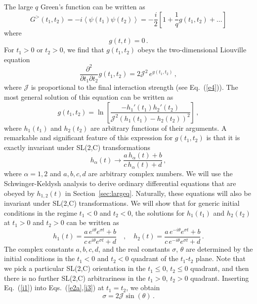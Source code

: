 \documentclass[prx,aps,onecolumn,amsfonts,showpacs,superscriptaddress,preprint,eqsecnum]
{revtex4-1}
\newcommand{\beq}{\begin{equation}}
\newcommand{\eeq}{\end{equation}}
\begin{document}
The large $q$ Green's function can be written as \cite{Maldacena2016}
\beq
G^> (t_1, t_2) = -i \left\langle \psi (t_1) \psi (t_2) \right\rangle = - \frac{i}{2} \left[ 
1 + \frac{1}{q} g(t_1, t_2) + \ldots \right] \label{e2}
\eeq
where 
\beq
g(t, t) = 0 \,. \label{e2a}
\eeq
For $t_1 >0$ or $t_2 > 0$, we find that $g(t_1, t_2)$ obeys the two-dimensional Liouville equation
\beq
\frac{\partial^2}{\partial t_1 \partial t_2} g(t_1, t_2) = 2 \mathcal{J}^2 \, e^{g (t_1, t_2)} \,,
\label{liouville}
\eeq
where $\mathcal{J}$ is proportional to the final interaction strength (see Eq.~(\ref{e4})).
The most general solution of this equation can be written as \cite{CROWDY}
\beq
g(t_1, t_2)  = \ln \left[ \frac{-h_1' (t_1) h_2' (t_2)}{\mathcal{J}^2 (h_{1} (t_1) - h_{2} (t_2))^2} \right] \, , \label{i3}
\eeq
where $h_1 (t_1)$ and $h_2 (t_2)$ are arbitrary functions of their arguments. A remarkable and significant
feature of this expression for $g(t_1, t_2)$ is that it is exactly invariant under SL(2,C) transformations
\beq
h_{\alpha} (t) \rightarrow \frac{a \, h_\alpha (t) + b}{c \, h_{\alpha} (t) + d} \label{sl2c} \, ,
\eeq
where $\alpha=1,2$ and $a,b,c,d$ are arbitrary complex numbers.
We will use the Schwinger-Keldysh analysis to derive ordinary differential equations
that are obeyed by $h_{1,2} (t)$ in Section~\ref{sec:largeq}. Naturally, 
these equations will also be invariant under SL(2,C) transformations. 
We will show that for generic initial conditions in the regime $t_{1}<0$ and $t_2 <0$, the solutions
for $h_1 (t_1)$ and $h_2 (t_2)$ at $t_1 > 0$ and $t_2 > 0$ can be written as
\beq
h_1 (t) = \frac{a \, e^{i \theta} e^{\sigma t} + b}{c\, e^{i \theta} e^{\sigma t} + d} 
\quad, \quad h_2 (t) = \frac{a \, e^{-i \theta} e^{\sigma t} + b}{c \, e^{-i \theta} e^{\sigma t} + d} \, . \label{i1}
\eeq
The complex constants $a,b,c,d$, and the real constants $\sigma$, $\theta$ are determined by the
initial conditions in the $t_1 < 0$ and $t_2 < 0$ quadrant of the $t_1$-$t_2$ plane. Note that we pick
a particular SL(2,C) orientation in the $t_1 \leq 0$, $t_2 \leq 0$ quadrant, and then there is no further
SL(2,C) arbitrariness in the $t_1>0$, $t_2 > 0$ quadrant. Inserting Eq.~(\ref{i1}) into Eqs.~(\ref{e2a},\ref{i3})
at $t_1=t_2$, we obtain
\beq
\sigma = 2 \mathcal{J} \sin(\theta) \,.
\eeq
\end{document}
